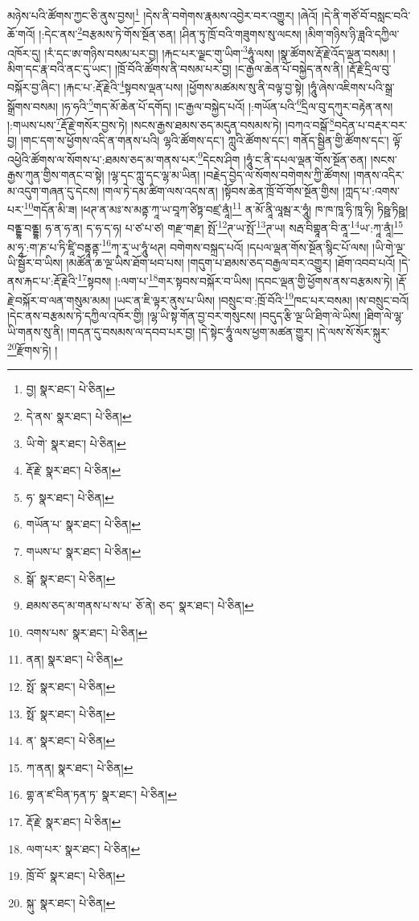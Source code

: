 མཉེས་པའི་ཚོགས་ཀྱང་ཅི་ནུས་བྱས།\footnote{བྱ།  སྣར་ཐང་།  པེ་ཅིན། } །དེས་ནི་བགེགས་རྣམས་འབྱེར་བར་འགྱུར། །ཞེའོ། །དེ་ནི་གཙོ་བོ་བསླང་བའི་ཆོ་གའོ། །:དེང་ནས་\footnote{དེ་ནས་  སྣར་ཐང་།  པེ་ཅིན། }བརྩམས་ཏེ་གོས་སྔོན་ཅན། །ཤིན་ཏུ་ཁྲོ་བའི་གཟུགས་སུ་ལངས། །མིག་གཉིས་ཉི་ཟླའི་དཀྱིལ་འཁོར་དུ། །རཾ་དང་ཨ་གཉིས་བསམ་པར་བྱ། །རྐང་པར་ལྗང་གུ་ཡིག་\footnote{ཡི་གེ་  སྣར་ཐང་།  པེ་ཅིན། }ཧཱུཾ་ལས། །སྣ་ཚོགས་རྡོ་རྗེ་འོད་ལྡན་བསམ། །མིག་དང་རྣ་བའི་ནང་དུ་ཡང་། །ཁྲོ་བོའི་ཚོགས་ནི་བསམ་པར་བྱ། །ང་རྒྱལ་ཆེན་པོ་བསྐྱེད་ནས་ནི། །རྡོ་རྗེ་དྲིལ་བུ་བསྐོར་བྱ་ཞིང་། །རྐང་པ་:རྡོ་རྗེའི་\footnote{རྡོ་རྗེ་  སྣར་ཐང་།  པེ་ཅིན། }སྟབས་ལྡན་པས། །ཕྱོགས་མཚམས་སུ་ནི་བལྟ་བྱ་སྟེ། །ཧཱུཾ་ཞེས་འཇིགས་པའི་སྒྲ་སྒྲོགས་བསམ། །ཧ་ཧའི་\footnote{ཧ་  སྣར་ཐང་།  པེ་ཅིན། }གད་མོ་ཆེན་པོ་དགོད། །ང་རྒྱལ་བསྐྱེད་པའོ། །:གཡོན་པའི་\footnote{གཡོན་པ་  སྣར་ཐང་།  པེ་ཅིན། }དྲིལ་བུ་དཀུར་བརྟེན་ནས། །:གཡས་པས་\footnote{གཡས་པ་  སྣར་ཐང་།  པེ་ཅིན། }རྡོ་རྗེ་གསོར་བྱས་ཏེ། །སངས་རྒྱས་ཐམས་ཅད་མདུན་བསམས་ཏེ། །བཀའ་བསྒོ་\footnote{སྒོ་  སྣར་ཐང་།  པེ་ཅིན། }བདེན་པ་བརྡར་བར་བྱ། །གང་དག་ས་ཕྱོགས་འདི་ན་གནས་པའི། ལྷའི་ཚོགས་དང་། ཀླུའི་ཚོགས་དང་། གནོད་སྦྱིན་གྱི་ཚོགས་དང་། ལྟོ་འཕྱེའི་ཚོགས་ལ་སོགས་པ་:ཐམས་ཅད་མ་གནས་པར་\footnote{ཐམས་ཅད་མ་གནས་པ་ས་པ་  ཅོ་ནེ། ཅད་  སྣར་ཐང་།  པེ་ཅིན། }དེངས་ཤིག །ཧཱུཾ་ང་ནི་དཔལ་ལྡན་གོས་སྔོན་ཅན། །སངས་རྒྱས་ཀུན་གྱིས་གནང་བ་སྟེ། །ལྷ་དང་ཀླུ་དང་ལྷ་མ་ཡིན། །བརྗེད་བྱེད་ལ་སོགས་བགེགས་ཀྱི་ཚོགས། །གནས་འདིར་མ་འདུག་གཞན་དུ་དེངས། །གལ་ཏེ་དམ་ཚིག་ལས་འདས་ན། །སྟོབས་ཆེན་ཁྲོ་བོ་གོས་སྔོན་གྱིས། །ཀླད་པ་:འགས་པར་\footnote{འགས་པས་  སྣར་ཐང་།  པེ་ཅིན། }གདོན་མི་ཟ། །ཕཊ་ན་མཿ་ས་མནྟ་ཀཱ་ཡ་བཱཀ་ཙིཏྟ་བཛྲ་ནཱཾ།\footnote{ནན།  སྣར་ཐང་།  པེ་ཅིན། } ན་མོ་ནཱི་ལཱམྦ་ར་ཧཱུཾ། ཁ་ཁ་ཁཱ་ཧི་ཁཱ་ཧི། ཏིཥྛ་ཏིཥྛ། བནྡྷ་བནྡྷ། ཧ་ན་ཧ་ན། ད་ཧ་ད་ཧ། པ་ཙ་པ་ཙ། གརྫ་གརྫ། སྤོ་\footnote{སྥོ་  སྣར་ཐང་།  པེ་ཅིན། }ཊ་ཡ་སྤོ་\footnote{སྥོ་  སྣར་ཐང་།  པེ་ཅིན། }ཊ་ཡ། སརྦ་བིགྷཱན་བི་ནཱ་\footnote{ན་  སྣར་ཐང་།  པེ་ཅིན། }ཡ་:ཀཱ་ནཱཾ།\footnote{ཀ་ནན།  སྣར་ཐང་།  པེ་ཅིན། } མ་ཧཱ་:ག་ཎ་པ་ཏི་ཛཱི་བནྟཱནྟ་\footnote{གྷ་ན་ཛ་བིན་ཏན་ཏ་  སྣར་ཐང་།  པེ་ཅིན། }ཀ་རཱ་ཡ་ཧཱུཾ་ཕཊ། བགེགས་བསྐྲད་པའོ། །དཔལ་ལྡན་གོས་སྔོན་སྙིང་པོ་ལས། །ཡི་གེ་ལྔ་ཡི་སྦྱོར་བ་ཡིས། །མཚོན་ཆ་ལྔ་ཡིས་ཐོག་ཕབ་པས། །གདུག་པ་ཐམས་ཅད་བརྒྱལ་བར་འགྱུར། །ཐོག་འབབ་པའོ། །དེ་ནས་རྐང་པ་:རྡོ་རྗེའི་\footnote{རྡོ་རྗེ་  སྣར་ཐང་།  པེ་ཅིན། }སྟབས། །:ལག་པ་\footnote{ལག་པར་  སྣར་ཐང་།  པེ་ཅིན། }གར་སྟབས་བསྐོར་བ་ཡིས། །དབང་ལྡན་གྱི་ཕྱོགས་ནས་བརྩམས་ཏེ། །རྡོ་རྗེ་བསྐོར་བ་ལན་གསུམ་མམ། །ཡང་ན་ཇི་ལྟར་ནུས་པ་ཡིས། །བསྲུང་བ་:ཁྲོ་བོའི་\footnote{ཁྲོ་བོ་  སྣར་ཐང་།  པེ་ཅིན། }ཁང་པར་བསམ། །ས་བསྲུང་བའོ། །དེང་ནས་བརྩམས་ཏེ་དཀྱིལ་འཁོར་གྱི། །ལྷ་ཡི་སྟ་གོན་བྱ་བར་གསུངས། །བདུད་རྩི་ལྔ་ཡི་ཐིག་ལེ་ཡིས། །ཐིག་ལེ་ལྷ་ཡི་གནས་སུ་ནི། །གདན་དུ་བསམས་ལ་དབབ་པར་བྱ། །དེ་སྟེང་ཧཱུཾ་ལས་ཕྱག་མཚན་གྱུར། །དེ་ལས་སོ་སོར་སྐུར་\footnote{སྐུ་  སྣར་ཐང་།  པེ་ཅིན། }རྫོགས་ཏེ། །
